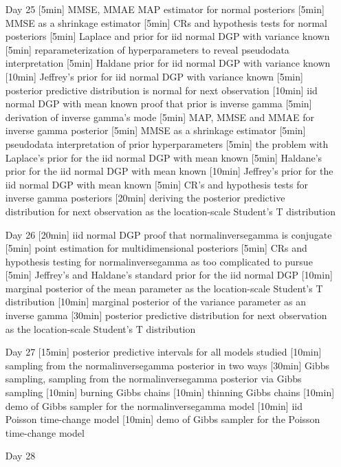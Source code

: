 \begin{enumerate}
\item[Day 25] [5min] MMSE, MMAE MAP estimator for normal posteriors [5min] MMSE as a shrinkage estimator [5min] CRs and hypothesis tests for normal posteriors  [5min] Laplace and  prior for iid normal DGP with variance known [5min] reparameterization of hyperparameters to reveal pseudodata interpretation [5min] Haldane prior for iid normal DGP with variance known [10min] Jeffrey's prior for iid normal DGP with variance known [5min] posterior predictive distribution is normal for next observation [10min] iid normal DGP with mean known proof that prior is inverse gamma [5min] derivation of inverse gamma's mode [5min] MAP, MMSE and MMAE for inverse gamma posterior [5min] MMSE as a shrinkage estimator [5min] pseudodata interpretation of prior hyperparameters [5min] the problem with Laplace's prior for the iid normal DGP with mean known [5min] Haldane's prior for the iid normal DGP with mean known [10min] Jeffrey's prior for the iid normal DGP with mean known [5min] CR's and hypothesis tests for inverse gamma posteriors [20min] deriving the posterior predictive distribution for next observation as the location-scale Student's T distribution

\item[Day 26] [20min] iid normal DGP proof that normalinversegamma is conjugate [5min] point estimation for multidimensional posteriors [5min] CRs and hypothesis testing for normalinversegamma as too complicated to pursue [5min] Jeffrey's and Haldane's standard prior for the iid normal DGP  [10min] marginal posterior of the mean parameter as  the location-scale Student's T distribution [10min] marginal posterior of the variance parameter as an inverse gamma [30min] posterior predictive distribution for next observation as the location-scale Student's T distribution 

\item[Day 27] [15min] posterior predictive intervals for all models studied [10min] sampling from the normalinversegamma posterior in two ways [30min] Gibbs sampling, sampling from the normalinversegamma posterior via Gibbs sampling [10min] burning Gibbs chains [10min] thinning Gibbs chains [10min] demo of Gibbs sampler for the normalinversegamma model [10min] iid Poisson time-change model [10min] demo of Gibbs sampler for the Poisson time-change model

\item[Day 28] 



\end{enumerate}
